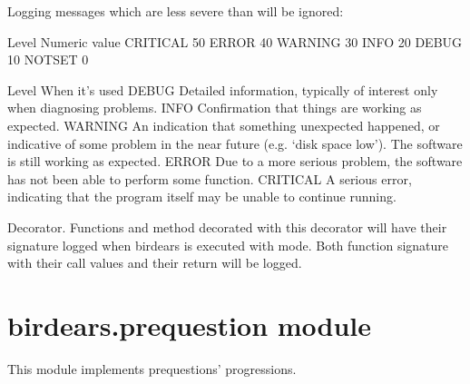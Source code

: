 \documentclass[letterpaper,10pt,english]{sphinxmanual}
\begin{document}
\sphinxAtStartPar
Logging messages which are less severe than  will be ignored:

\begin{sphinxVerbatim}[commandchars=\\\{\}]
Level       Numeric value
\PYGZhy{}\PYGZhy{}\PYGZhy{}\PYGZhy{}\PYGZhy{}       \PYGZhy{}\PYGZhy{}\PYGZhy{}\PYGZhy{}\PYGZhy{}\PYGZhy{}\PYGZhy{}\PYGZhy{}\PYGZhy{}\PYGZhy{}\PYGZhy{}\PYGZhy{}\PYGZhy{}
CRITICAL    50
ERROR       40
WARNING     30
INFO        20
DEBUG       10
NOTSET      0

Level       When it’s used
\PYGZhy{}\PYGZhy{}\PYGZhy{}\PYGZhy{}\PYGZhy{}       \PYGZhy{}\PYGZhy{}\PYGZhy{}\PYGZhy{}\PYGZhy{}\PYGZhy{}\PYGZhy{}\PYGZhy{}\PYGZhy{}\PYGZhy{}\PYGZhy{}\PYGZhy{}\PYGZhy{}\PYGZhy{}
DEBUG       Detailed information, typically of interest only when
                diagnosing problems.
INFO        Confirmation that things are working as expected.
WARNING     An indication that something unexpected happened, or indicative
                of some problem in the near future (e.g. ‘disk space low’).
                The software is still working as expected.
ERROR       Due to a more serious problem, the software has not been able
                to perform some function.
CRITICAL    A serious error, indicating that the program itself may be
                unable to continue running.
\end{sphinxVerbatim}

\begin{fulllineitems}
\label{\detokenize{index:birdears.logger.log_event}}
\sphinxAtStartPar
Decorator. Functions and method decorated with this decorator will have
their signature logged when birdears is executed with  mode. Both
function signature with their call values and their return will be logged.

\end{fulllineitems}



\section{birdears.prequestion module}
\label{\detokenize{index:module-birdears.prequestion}}\label{\detokenize{index:birdears-prequestion-module}}
\sphinxAtStartPar
This module implements pre\sphinxhyphen{}questions’ progressions.
\end{document}
